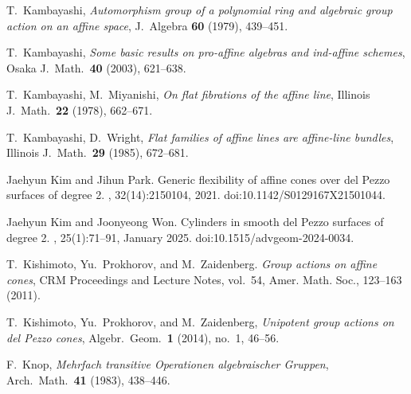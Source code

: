 T.~Kambayashi, \emph{
Automorphism group of a polynomial ring and algebraic group action
on an affine space}, J.\ Algebra \textbf{60} (1979), 439--451.

T.~Kambayashi,  \emph{Some basic results on pro-affine algebras and ind-affine schemes},
Osaka J.\ Math.\  \textbf{40} (2003), 621--638.

T.~Kambayashi, M.~Miyanishi, \emph{On flat fibrations of the affine line},
Illinois J.\ Math.\ \textbf{22} (1978), 662--671.

T.~Kambayashi, D.~Wright, \emph{Flat families of affine lines are affine-line bundles},
Illinois J.\ Math.\ \textbf{29} (1985), 672--681.

Jaehyun Kim and Jihun Park.
\newblock Generic flexibility of affine cones over del {Pezzo} surfaces of degree 2.
, 32(14):2150104, 2021.
\newblock doi:10.1142/S0129167X21501044.

Jaehyun Kim and Joonyeong Won.
\newblock Cylinders in smooth del {Pezzo} surfaces of degree 2.
, 25(1):71--91, January 2025.
\newblock doi:10.1515/advgeom-2024-0034.


T.~Kishimoto, Yu.~Prokhorov, and M.~Zaidenberg.
\emph{Group actions on affine cones}, CRM Proceedings and Lecture Notes, vol.~54, Amer. Math. Soc.,
123--163 (2011).


T.~Kishimoto, Yu.~Prokhorov, and M.~Zaidenberg,
\emph{Unipotent group actions on del Pezzo cones},
Algebr.\ Geom.\ \textbf{1} (2014), no.~1, 46--56.

F.~Knop, \emph{Mehrfach transitive Operationen algebraischer Gruppen},
Arch.\ Math.\ \textbf{41} (1983), 438--446.

